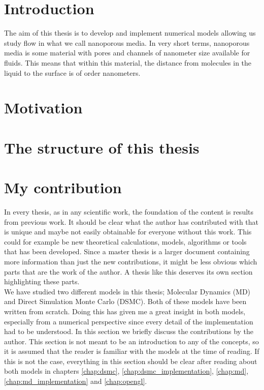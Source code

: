 \section{Introduction}
The aim of this thesis is to develop and implement numerical models allowing us study flow in what we call nanoporous media. In very short terms, nanoporous media is some material with pores and channels of nanometer size available for fluids. This means that within this material, the distance from molecules in the liquid to the surface is of order nanometers. 

\section{Motivation}


\section{The structure of this thesis}

\section{My contribution}
In every thesis, as in any scientific work, the foundation of the content is results from previous work. It should be clear what the author has contributed with that is unique and maybe not easily obtainable for everyone without this work. This could for example be new theoretical calculations, models, algorithms or tools that has been developed. Since a master thesis is a larger document containing more information than just the new contributions, it might be less obvious which parts that are the work of the author. A thesis like this deserves its own section highlighting these parts.\\
We have studied two different models in this thesis; Molecular Dynamics (MD) and Direct Simulation Monte Carlo (DSMC). Both of these models have been written from scratch. Doing this has given me a great insight in both models, especially from a numerical perspective since every detail of the implementation had to be understood. In this section we briefly discuss the contributions by  the author. This section is not meant to be an introduction to any of the concepts, so it is assumed that the reader is familiar with the models at the time of reading. If this is not the case, everything in this section should be clear after reading about both models in chapters \ref{chap:dsmc}, \ref{chap:dsmc_implementation}, \ref{chap:md}, \ref{chap:md_implementation} and \ref{chap:opengl}.
